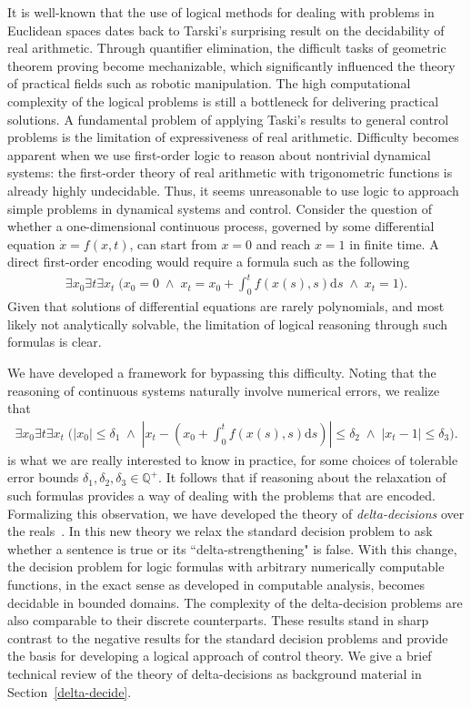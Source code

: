 \documentclass[10pt]{article}
\theoremstyle{definition}
\begin{document}
It is well-known that the use of logical methods for dealing with problems in Euclidean spaces dates back to Tarski's surprising result on the decidability of real arithmetic. Through quantifier elimination, the difficult tasks of geometric theorem proving become mechanizable, which significantly influenced the theory of practical fields such as robotic manipulation. The high computational complexity of the logical problems is still a bottleneck for delivering practical solutions. A fundamental problem of applying Taski's results to general control problems is the limitation of expressiveness of real arithmetic. Difficulty becomes apparent when we use first-order logic to reason about nontrivial dynamical systems: the first-order theory of real arithmetic with trigonometric functions is already highly undecidable. Thus, it seems unreasonable to use logic to approach simple problems in dynamical systems and control. Consider the question of whether a one-dimensional continuous process, governed by some differential equation $\dot{x} = f(x,t)$, can start from $x=0$ and reach $x=1$ in finite time. A direct first-order encoding would require a formula such as the following
\begin{eqnarray}
\exists x_0 \exists t \exists x_t\; \bigg(x_0 = 0 \;\wedge\; x_t = x_0 + \int_{0}^t f(x(s),s)\mathrm{d}s\; \wedge\; x_t = 1\bigg).
\end{eqnarray}
Given that solutions of differential equations are rarely polynomials, and most likely not analytically solvable, the limitation of logical reasoning through such formulas is clear. 

We have developed a framework for bypassing this difficulty. Noting that the reasoning of continuous systems naturally involve numerical errors, we realize that
\begin{eqnarray}
\exists x_0 \exists t \exists x_t\; \bigg(|x_0| \leq \delta_1 \;\wedge\; |x_t - (x_0 + \int_{0}^t f(x(s),s)\mathrm{d}s)| \leq \delta_2\; \wedge\; |x_t - 1|\leq \delta_3\bigg).
\end{eqnarray}
is what we are really interested to know in practice, for some choices of tolerable error bounds $\delta_1, \delta_2, \delta_3\in\mathbb{Q}^+$. It follows that if reasoning about the relaxation of such formulas provides a way of dealing with the problems that are encoded. Formalizing this observation, we have developed the theory of {\em delta-decisions} over the reals~\cite{DBLP:conf/lics/GaoAC12,DBLP:conf/cade/GaoAC12}. In this new theory we relax the standard decision problem to ask whether a sentence is true or its ``delta-strengthening" is false. With this change, the decision problem for logic formulas with arbitrary numerically computable functions, in the exact sense as developed in computable analysis, becomes decidable in bounded domains. The complexity of the delta-decision problems are also comparable to their discrete counterparts. These results stand in sharp contrast to the negative results for the standard decision problems and provide the basis for developing a logical approach of control theory. We give a brief technical review of the theory of delta-decisions as background material in Section~\ref{delta-decide}. 
\end{document}
